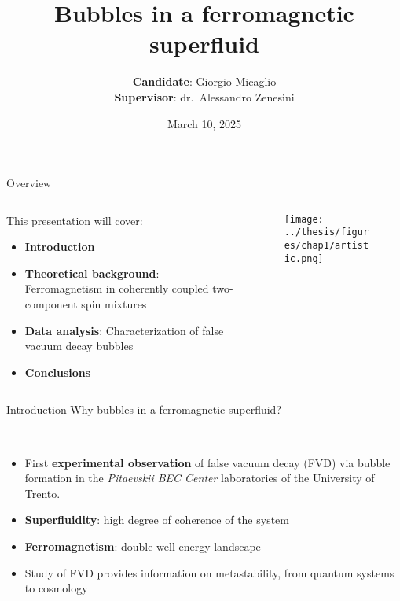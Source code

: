 \documentclass[aspectratio=169]{beamer}
\title[Bubbles in a ferromagnetic superfluid] %
{Bubbles in a ferromagnetic superfluid} %
\author{\textbf{Candidate}: Giorgio Micaglio\\\textbf{Supervisor}: dr.\ Alessandro Zenesini}
\institute{Bachelor's Degree in Physics}
\date[March 10, 2025]  %
{March 10, 2025} %
\begin{document}
\begin{frame}[plain]
  \titlepage
\end{frame}

\begin{frame}{Overview}
  \begin{columns}
      \begin{column}{0.7\textwidth}
          This presentation will cover:
          \begin{itemize}
              \item \textbf{Introduction}
              \item \textbf{Theoretical background}: Ferromagnetism in coherently coupled two-component spin mixtures
              \item \textbf{Data analysis}: Characterization of false vacuum decay bubbles
              \item \textbf{Conclusions}
          \end{itemize}
      \end{column}
      \begin{column}{0.3\textwidth}
          \begin{figure}
              \centering
              \texttt{[image: ../thesis/figures/chap1/artistic.png]}
          \end{figure}
      \end{column}
  \end{columns}
\end{frame}

\begin{frame}{Introduction}
  Why bubbles in a ferromagnetic superfluid?

  ~

  \begin{itemize}
      \item First \textbf{experimental observation} of false vacuum decay (FVD) via bubble formation in the \emph{Pitaevskii BEC Center} laboratories of the University of Trento.
      \item \textbf{Superfluidity}: high degree of coherence of the system
      \item \textbf{Ferromagnetism}: double well energy landscape
      \item Study of FVD provides information on metastability, from quantum systems to cosmology
  \end{itemize}
  
\end{frame}
\end{document}
